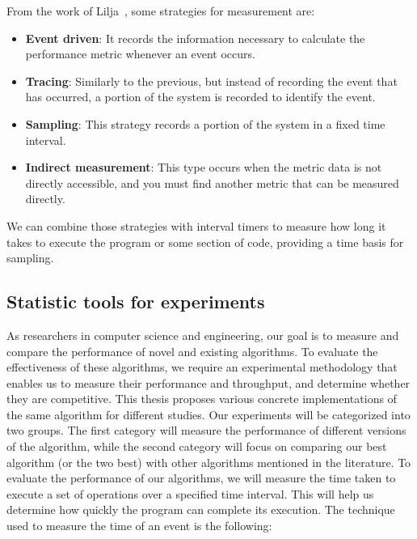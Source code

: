 From the work of Lilja~\cite{lilja2005measuring}, some strategies for measurement are:

\begin{itemize}
\item \textbf{Event driven}: It records the information necessary to calculate the
performance metric whenever an event occurs.
\item \textbf{Tracing}: Similarly to the previous, but instead of recording the event
that has occurred, a portion of the system is recorded to identify the event.
\item \textbf{Sampling}: This strategy records a portion of the system in a fixed time
interval.
\item \textbf{Indirect measurement}: This type occurs when the metric data is not
directly accessible, and you must find another metric that can be measured
directly.
\end{itemize}

We can combine those strategies with interval timers to measure how long it takes to execute the program or some section of code, providing a time basis for sampling.




\subsection{\label{subsec:statistics}Statistic tools for experiments}

As researchers in computer science and engineering, our goal is to measure and compare the performance of novel and existing algorithms. To evaluate the effectiveness of these algorithms, we require an experimental methodology that enables us to measure their performance and throughput, and determine whether they are competitive. This thesis proposes various concrete implementations of the same algorithm for different studies. Our experiments will be categorized into two groups. The first category will measure the performance of different versions of the algorithm, while the second category will focus on comparing our best algorithm (or the two best) with other algorithms mentioned in the literature. To evaluate the performance of our algorithms, we will measure the time taken to execute a set of operations over a specified time interval. This will help us determine how quickly the program can complete its execution. The technique used to measure the time of an event is the following:

